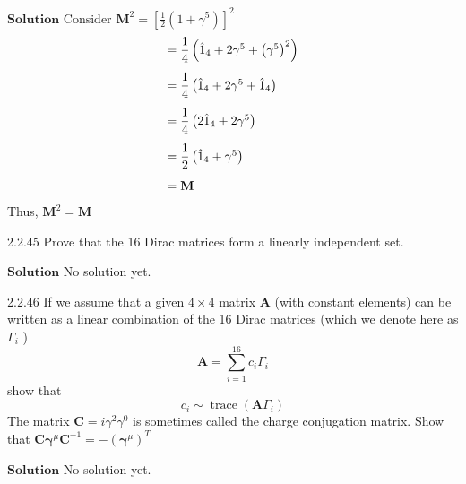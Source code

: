 $\boxed{\textbf{Solution}}$ Consider $\mathbf{M}^{2}=\left[\frac{1}{2}\left(1+\gamma^{5}\right)\right]^{2}$
$$
\begin{array}{l}
=\dfrac{1}{4}\left(\hat{1}_{4}+2 \gamma^{5}+\left(\gamma^{5}\right)^{2}\right)\vspace{3mm} \\
=\dfrac{1}{4}\left(\hat{1}_{4}+2 \gamma^{5}+\hat{1}_{4}\right) \vspace{3mm}\\
=\dfrac{1}{4}\left(2\hat{1}_{4}+2 \gamma^{5}\right) \vspace{3mm}\\
=\dfrac{1}{2}\left(\hat{1}_{4}+\gamma^{5}\right) \vspace{3mm}\\
=\mathbf{M}
\end{array}
$$
Thus, $\mathbf{M}^2 = \mathbf{M}$
 
\newpage


\begin{mybox}{2.2.45}
Prove that the 16 Dirac matrices form a linearly independent set.
\end{mybox}


$\boxed{\textbf{Solution}}$ No solution yet.

\newpage

\begin{mybox}{2.2.46}
If we assume that a given $4 \times 4$ matrix $\mathbf{A}$ (with constant elements) can be written as a linear combination of the 16 Dirac matrices (which we denote here as $\Gamma_{i}$ )
$$
\mathbf{A}=\sum_{i=1}^{16} c_{i} \Gamma_{i}
$$
show that
$$
c_{i} \sim \operatorname{trace}\left(\mathbf{A} \Gamma_{i}\right)
$$
The matrix $\mathbf{C}=i \gamma^{2} \gamma^{0}$ is sometimes called the charge conjugation matrix. Show that $\mathbf{C} \boldsymbol{\gamma}^{\mu} \mathbf{C}^{-1}=-\left(\boldsymbol{\gamma}^{\mu}\right)^{T}$
\end{mybox}

$\boxed{\textbf{Solution}}$ No solution yet.

\newpage

